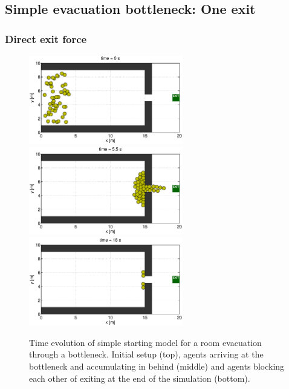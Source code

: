 \documentclass[11pt]{article}
\begin{document}
\subsection{Simple evacuation bottleneck: One exit}

\subsubsection{Direct exit force}

\begin{figure}
	\begin{center}
	\includegraphics[width=0.6\textwidth]
	{figures/Model1_direct_1b_000000.eps}
	\qquad
	\includegraphics[width=0.6\textwidth]
	{figures/Model1_direct_1b_000550.eps}
	\qquad
	\includegraphics[width=0.6\textwidth]
	{figures/Model1_direct_1b_001800.eps}
	\caption{Time evolution of simple starting model for a room evacuation through a bottleneck. Initial setup (top), agents arriving at the bottleneck and accumulating in behind (middle) and agents blocking each other of exiting at the end of the simulation (bottom).}
	\label{fig:simple1}
	\end{center}
\end{figure}
\end{document}
